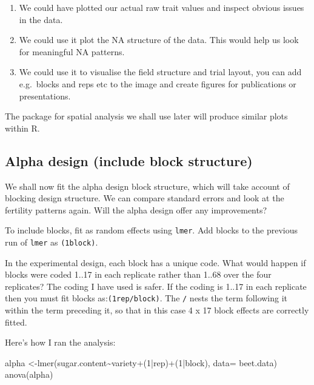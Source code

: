 \documentclass[
]{book}
\makeatletter
\newenvironment{Shaded}{\begin{snugshade}}{\end{snugshade}}
\newcommand{\AttributeTok}[1]{\textcolor[rgb]{0.77,0.63,0.00}{#1}}
\newcommand{\DecValTok}[1]{\textcolor[rgb]{0.00,0.00,0.81}{#1}}
\newcommand{\FunctionTok}[1]{\textcolor[rgb]{0.00,0.00,0.00}{#1}}
\newcommand{\NormalTok}[1]{#1}
\newcommand{\OtherTok}[1]{\textcolor[rgb]{0.56,0.35,0.01}{#1}}
\newcommand{\SpecialCharTok}[1]{\textcolor[rgb]{0.00,0.00,0.00}{#1}}
\providecommand{\tightlist}{%
  \setlength{\itemsep}{0pt}\setlength{\parskip}{0pt}}
\newenvironment{kframe}{%
\medskip{}
\setlength{\fboxsep}{.8em}
 \def\at@end@of@kframe{}%
 \ifinner\ifhmode%
  \def\at@end@of@kframe{\end{minipage}}%
  \begin{minipage}{\columnwidth}%
 \fi\fi%
 \def\FrameCommand##1{\hskip\@totalleftmargin \hskip-\fboxsep
 \colorbox{shadecolor}{##1}\hskip-\fboxsep
     \hskip-\linewidth \hskip-\@totalleftmargin \hskip\columnwidth}%
 \MakeFramed {\advance\hsize-\width
   \@totalleftmargin\z@ \linewidth\hsize
   \@setminipage}}%
 {\par\unskip\endMakeFramed%
 \at@end@of@kframe}
\newenvironment{rmdblock}[1]
  {
  \begin{itemize}
  \renewcommand{\labelitemi}{
    \raisebox{-.7\height}[0pt][0pt]{
      {\setkeys{Gin}{width=3em,keepaspectratio}\texttt{[image: images/\#1]}}
    }
  }
  \setlength{\fboxsep}{1em}
  \begin{kframe}
  \item
  }
  {
  \end{kframe}
  \end{itemize}
  }
\newenvironment{rmdnote}
  {\begin{rmdblock}{note}}
  {\end{rmdblock}}
\makeatother
\begin{document}
\begin{enumerate}
\def\labelenumi{\arabic{enumi}.}
\tightlist
\item
  We could have plotted our actual raw trait values and inspect obvious issues in the data.
\item
  We could use it plot the NA structure of the data. This would help us look for meaningful NA patterns.
\item
  We could use it to visualise the field structure and trial layout, you can add e.g.~blocks and reps etc to the image and create figures for publications or presentations.
\end{enumerate}

The package for spatial analysis we shall use later will produce similar plots within R.

\hypertarget{alpha-design-include-block-structure}{%
\subsection{Alpha design (include block structure)}\label{alpha-design-include-block-structure}}

We shall now fit the alpha design block structure, which will take account of blocking design structure. We can compare standard errors and look at the fertility patterns again. Will the alpha design offer any improvements?

To include blocks, fit as random effects using \texttt{lmer}. Add blocks to the previous run of \texttt{lmer} as \texttt{(1\textbar{}block)}.

\begin{rmdnote}
In the experimental design, each block has a unique code. What would happen if blocks were coded 1..17 in each replicate rather than 1..68 over the four replicates? The coding I have used is safer. If the coding is 1..17 in each replicate then you must fit blocks as:\texttt{(1\textbar{}rep/block)}. The \texttt{/} nests the term following it within the term preceding it, so that in this case 4 x 17 block effects are correctly fitted.
\end{rmdnote}

Here's how I ran the analysis:

\begin{Shaded}
\begin{Highlighting}[]
\NormalTok{alpha }\OtherTok{\textless{}{-}}\FunctionTok{lmer}\NormalTok{(sugar.content}\SpecialCharTok{\textasciitilde{}}\NormalTok{variety}\SpecialCharTok{+}\NormalTok{(}\DecValTok{1}\SpecialCharTok{|}\NormalTok{rep)}\SpecialCharTok{+}\NormalTok{(}\DecValTok{1}\SpecialCharTok{|}\NormalTok{block), }\AttributeTok{data=}\NormalTok{ beet.data)}
\FunctionTok{anova}\NormalTok{(alpha)}
\end{Highlighting}
\end{Shaded}
\end{document}
